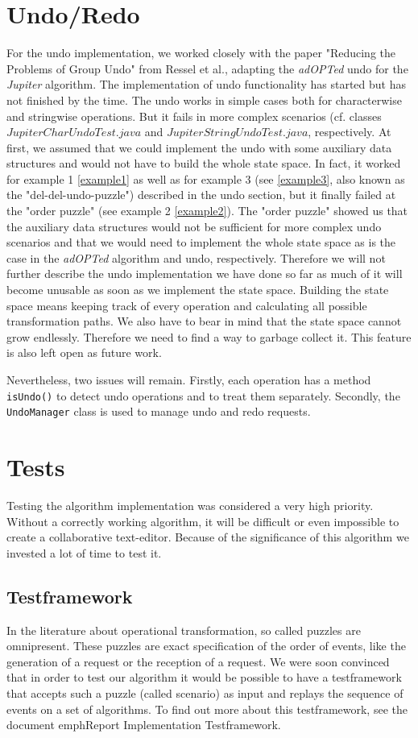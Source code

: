 \section{Undo/Redo}
\label{undo_redo}
For the undo implementation, we worked closely with the paper "Reducing the Problems of Group Undo" from Ressel et al., adapting the \emph{adOPTed} undo for the \emph{Jupiter} algorithm. 
The implementation of undo functionality has started but has not finished by the time. The undo works in simple cases both for characterwise and stringwise operations. But it fails in more complex scenarios (cf. classes $JupiterCharUndoTest.java$ and $JupiterStringUndoTest.java$, respectively. At first, we assumed that we could implement the undo with some auxiliary data structures and would not have to build the whole state space. In fact, it worked for example 1 \ref{example1} as well as for example 3 (see \ref{example3}, also known as the "del-del-undo-puzzle") described in the undo section, but it finally failed at the "order puzzle" (see example 2 \ref{example2}). The "order puzzle" showed us that the auxiliary data structures would not be sufficient for more complex undo scenarios and that we would need to implement the whole state space as is the case in the \emph{adOPTed} algorithm and undo, respectively. 
Therefore we will not further describe the undo implementation we have done so far as much of it will become unusable as soon as we implement the state space. Building the state space means keeping track of every operation and calculating all possible transformation paths. We also have to bear in mind that the state space cannot grow endlessly. Therefore we need to find a way to garbage collect it. This feature is also left open as future work.

Nevertheless, two issues will remain. Firstly, each operation has a method \texttt{isUndo()} to detect undo operations and to treat them separately. Secondly, the \texttt{UndoManager} class is used to manage undo and redo requests.

\section{Tests}
Testing the algorithm implementation was considered a very high priority. Without a correctly working algorithm, it will be difficult or even impossible to create a collaborative text-editor. Because of the significance of this algorithm we invested a lot of time to test it.

\subsection{Testframework}
In the literature about operational transformation, so called puzzles are omnipresent. These puzzles are exact specification of the order of events, like the generation of a request or the reception of a request. We were soon convinced that in order to test our algorithm it would be possible to have a testframework that accepts such a puzzle (called scenario) as input and replays the sequence of events on a set of algorithms. To find out more about this testframework, see the document emph{Report Implementation Testframework}.

